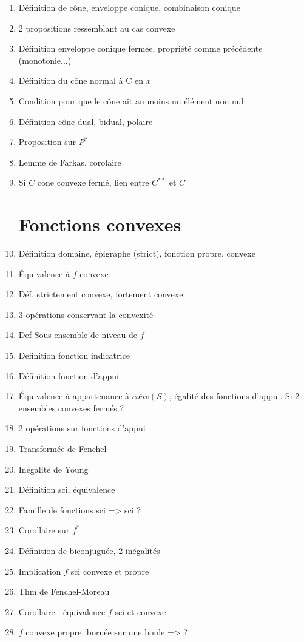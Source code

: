 \documentclass{article}
\begin{document}
\begin{enumerate}
	\item Définition de cône, enveloppe conique, combinaison conique
	\item 2 propositions ressemblant au cas convexe
	\item Définition enveloppe conique fermée, propriété comme précédente (monotonie...)
	\item Définition du cône normal à C en $x$
	\item Condition pour que le cône ait au moins un élément non nul
	\item Définition cône dual, bidual, polaire
	\item Proposition sur $P^*$
	\item Lemme de Farkas, corolaire
	\item Si $C$ cone convexe fermé, lien entre $C^{**}$ et $C$
\section{Fonctions convexes}
	\item Définition domaine, épigraphe (strict), fonction propre, convexe
	\item Équivalence à $f$ convexe
	\item Déf. strictement convexe, fortement convexe
	\item 3 opérations conservant la convexité
	\item Def Sous ensemble de niveau de $f$
	\item Definition fonction indicatrice
	\item Définition fonction d'appui
	\item Équivalence à appartenance à $\overline{conv}(S)$, égalité des fonctions d'appui. Si 2 ensembles convexes fermés ?
	\item 2 opérations sur fonctions d'appui
	\item Transformée de Fenchel
	\item Inégalité de Young
	\item Définition sci, équivalence
	\item Famille de fonctions sci => sci ?
	\item Corollaire sur $f^*$
	\item Définition de biconjuguée, 2 inégalités
	\item Implication $f$ sci convexe et propre
	\item Thm de Fenchel-Moreau
	\item Corollaire : équivalence $f$ sci et convexe
	\item $f$ convexe propre, bornée sur une boule => ?

\end{enumerate}
\end{document}
